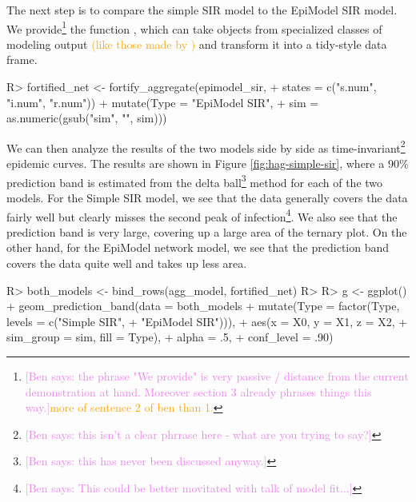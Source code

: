 \documentclass[
  shortnames]{jss}
\begin{document}
The next step is to compare the simple SIR model to the EpiModel SIR
model. We
provide\footnote{\textcolor{violet}{[Ben says: the phrase "We provide" is very passive / distance from the current demonstration at hand. Moreover section 3 already phrases things this way.]}\textcolor{orange}{more of sentence 2 of ben than 1.}}
the function , which can take objects from
specialized classes of modeling output
\textcolor{orange}{(like those made by )} and transform
it into a tidy-style data frame.

\begin{CodeChunk}
\begin{CodeInput}
R> fortified_net <- fortify_aggregate(epimodel_sir, 
+                                    states = c("s.num", "i.num", "r.num")) %
+   mutate(Type = "EpiModel SIR",
+          sim = as.numeric(gsub("sim", "", sim)))
\end{CodeInput}
\end{CodeChunk}

We can then analyze the results of the two models side by side as
time-invariant\footnote{\textcolor{violet}{[Ben says: this isn't a clear phrrase here - what are you trying to say?]}}
epidemic curves. The results are shown in Figure
\ref{fig:hag-simple-sir}, where a 90\% prediction band is estimated from
the delta
ball\footnote{\textcolor{violet}{[Ben says: this has never been discussed anyway.]}}
method for each of the two models. For the Simple SIR model, we see that
the data generally covers the data fairly well but clearly misses the
second peak of
infection\footnote{\textcolor{violet}{[Ben says: This could be better movitated with talk of model fit...]}}.
We also see that the prediction band is very large, covering up a large
area of the ternary plot. On the other hand, for the EpiModel network
model, we see that the prediction band covers the data quite well and
takes up less area.

\begin{CodeChunk}
\begin{CodeInput}
R> both_models <- bind_rows(agg_model, fortified_net)
R> 
R> g <- ggplot() + geom_prediction_band(data = both_models %
+                   mutate(Type = factor(Type, levels = c("Simple SIR", 
+                                                         "EpiModel SIR"))),
+          aes(x = X0, y = X1, z = X2,
+               sim_group = sim, fill = Type),
+          alpha = .5,
+          conf_level = .90) 
\end{CodeInput}
\end{CodeChunk}
\end{document}

